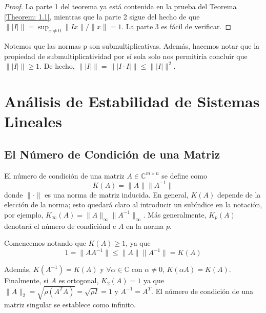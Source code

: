 \begin{proof}
    La parte 1 del teorema ya está contenida en la prueba del Teorema \ref{Theorem: 1.1}, mientras que la parte 2 sigue del hecho de que $ \||I|\| = \sup_{x \neq 0}{\|Ix\| / \|x\|} = 1 $. La parte 3 es fácil de verificar.
\end{proof}

Notemos que las normas p son submultiplicativas. Además, hacemos notar que la propiedad de submultiplicatividad por sí sola solo nos permitiría concluir que $\||I|\| \geq 1$. De hecho, $\||I|\| = \||I \cdot I|\| \leq \||I|\|^2$.

\section{Análisis de Estabilidad de Sistemas Lineales}

\subsection{El Número de Condición de una Matriz}

El número de condición de una matriz $A \in \mathbb{C}^{m \times n}$ se define como
\begin{equation}
    K(A) = \|A\| \|A^{-1}\|
    \label{Eq: (3.4)}
\end{equation}
donde $\|\cdot\|$ es una norma de matriz inducida. En general, $K(A)$ depende de la elección de la norma; esto quedará claro al introducir un subíndice en la notación, por ejemplo, $K_\infty(A) = \|A\|_\infty \|A^{-1}\|_\infty$. Más generalmente, $K_p(A)$ denotará el número de condiciónd e $A$ en la norma $p$.

Comencemos notando que $K(A) \geq 1$, ya que
\[ 1 = \|A A^{-1}\| \leq \|A\| \|A^{-1}\| = K(A) \]

Además, $K(A^{-1}) = K(A)$ y $\forall \alpha \in \mathbb{C}$ con $\alpha \neq 0$, $K(\alpha A) = K(A)$. Finalmente, si $A$ es ortogonal, $K_2(A) = 1$ ya que $\|A\|_2 = \sqrt{\rho (A^T A)} = \sqrt{\rho I} = 1$ y $A^{-1} = A^T$. El número de condición de una matriz singular se establece como infinito.

